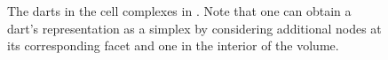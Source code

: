 \begin{figure}[tbp]
\centering
{}
\quad
{}
\caption[The darts in the cell complexes in ]{The darts in the cell complexes in .
Note that one can obtain a dart's representation as a simplex by considering additional nodes at its corresponding facet and one in the interior of the volume.}
\label{fig:triangle}
\end{figure}

